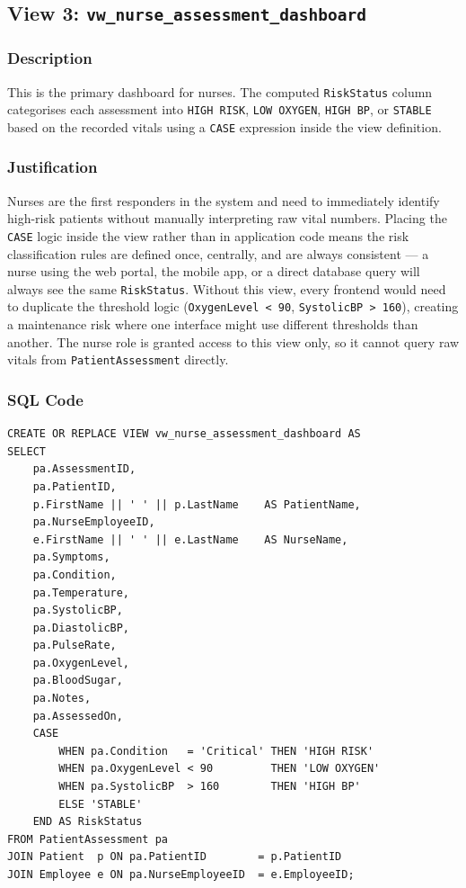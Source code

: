 \documentclass{article}
\begin{document}
\subsection{View 3: \texttt{vw\_nurse\_assessment\_dashboard}}

\subsubsection{Description}
This is the primary dashboard for nurses. The computed \texttt{RiskStatus} column categorises each assessment into \texttt{HIGH RISK}, \texttt{LOW OXYGEN}, \texttt{HIGH BP}, or \texttt{STABLE} based on the recorded vitals using a \texttt{CASE} expression inside the view definition.

\subsubsection{Justification}
Nurses are the first responders in the system and need to immediately identify high-risk patients without manually interpreting raw vital numbers. Placing the \texttt{CASE} logic inside the view rather than in application code means the risk classification rules are defined once, centrally, and are always consistent --- a nurse using the web portal, the mobile app, or a direct database query will always see the same \texttt{RiskStatus}. Without this view, every frontend would need to duplicate the threshold logic (\texttt{OxygenLevel < 90}, \texttt{SystolicBP > 160}), creating a maintenance risk where one interface might use different thresholds than another. The nurse role is granted access to this view only, so it cannot query raw vitals from \texttt{PatientAssessment} directly.

\subsubsection{SQL Code}

\begin{lstlisting}
CREATE OR REPLACE VIEW vw_nurse_assessment_dashboard AS
SELECT
    pa.AssessmentID,
    pa.PatientID,
    p.FirstName || ' ' || p.LastName    AS PatientName,
    pa.NurseEmployeeID,
    e.FirstName || ' ' || e.LastName    AS NurseName,
    pa.Symptoms,
    pa.Condition,
    pa.Temperature,
    pa.SystolicBP,
    pa.DiastolicBP,
    pa.PulseRate,
    pa.OxygenLevel,
    pa.BloodSugar,
    pa.Notes,
    pa.AssessedOn,
    CASE
        WHEN pa.Condition   = 'Critical' THEN 'HIGH RISK'
        WHEN pa.OxygenLevel < 90         THEN 'LOW OXYGEN'
        WHEN pa.SystolicBP  > 160        THEN 'HIGH BP'
        ELSE 'STABLE'
    END AS RiskStatus
FROM PatientAssessment pa
JOIN Patient  p ON pa.PatientID        = p.PatientID
JOIN Employee e ON pa.NurseEmployeeID  = e.EmployeeID;
\end{lstlisting}
\end{document}
